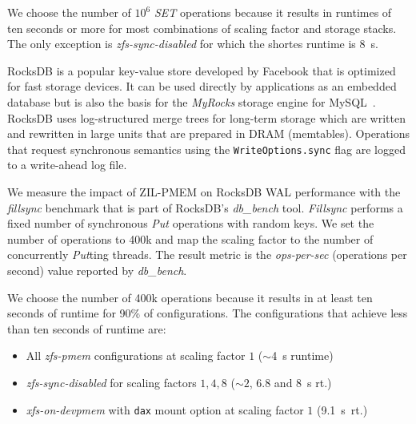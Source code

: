 \documentclass[12pt,a4paper,twoside]{book}
\begin{document}
\begin{description}[noitemsep,leftmargin=1.5cm,labelindent=1cm]
        We choose the number of $10^6$ \textit{SET} operations because it results in runtimes of ten seconds or more for most combinations of scaling factor and storage stacks.
        The only exception is \textit{zfs-sync-disabled} for which the shortes runtime is \SI{8}{s}.

    \item[RocksDB-fillsync] RocksDB is a popular key-value store developed by Facebook that is optimized for fast storage devices.
        It can be used directly by applications as an embedded database but is also the basis for the \textit{MyRocks} storage engine for MySQL~\cite{MyRocksRocksDBStorage}.
        RocksDB uses log-structured merge trees for long-term storage which are written and rewritten in large units that are prepared in DRAM (memtables).
        Operations that request synchronous semantics using the \lstinline{WriteOptions.sync} flag are logged to a write-ahead log file.~\cite{FlushWALLessFwrite,RocksDBGitHubWikiWalPerformance}

        We measure the impact of ZIL-PMEM on RocksDB WAL performance with the \textit{fillsync} benchmark that is part of RocksDB's \textit{db\_bench} tool.
        \textit{Fillsync} performs a fixed number of synchronous \textit{Put} operations with random keys.
        We set the number of operations to 400k and map the scaling factor to the number of concurrently \textit{Put}ting threads.
        The result metric is the \textit{ops-per-sec} (operations per second) value reported by \textit{db\_bench}.

        We choose the number of 400k operations because it results in at least ten seconds of runtime for 90\% of configurations.
        The configurations that achieve less than ten seconds of runtime are:
        \begin{itemize}[noitemsep]
            \item All \textit{zfs-pmem} configurations at scaling factor $1$ ($\sim$\SI{4}{s} runtime)
            \item \textit{zfs-sync-disabled} for scaling factors $1, 4, 8$ (${\sim}2$, $6.8$ and \SI{8}{s} rt.)
            \item \textit{xfs-on-devpmem} with \lstinline{dax} mount option at scaling factor $1$ (\SI{9.1}{s}~rt.)
        \end{itemize}
\end{description}
\end{document}
